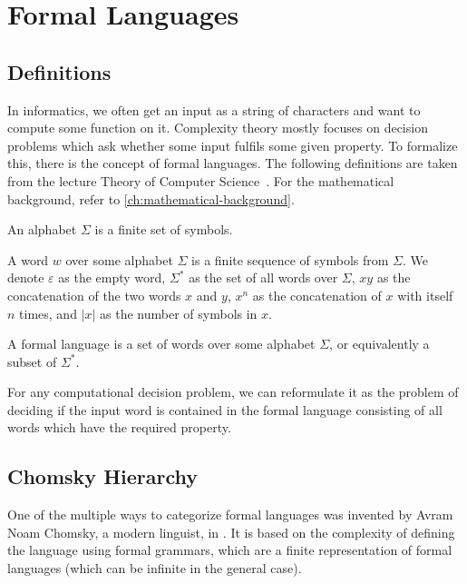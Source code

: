 \chapter{Formal Languages}\label{ch:formal-languages}


\section{Definitions}\label{sec:definition}

In informatics, we often get an input as a string of characters and want to compute some function on it.
Complexity theory mostly focuses on decision problems which ask whether some input fulfils some given property.
To formalize this, there is the concept of formal languages.
The following definitions are taken from the lecture Theory of Computer Science~\cite{theory-cs}.
For the mathematical background, refer to \cref{ch:mathematical-background}.

\begin{define}[Alphabet]
    An alphabet $\Sigma$ is a finite set of symbols.
\end{define}

\begin{define}[Word]
    A word $w$ over some alphabet $\Sigma$ is a finite sequence of symbols from $\Sigma$.
    We denote $\varepsilon$ as the empty word, $\Sigma^*$ as the set of all words over $\Sigma$, $xy$ as the concatenation of the two words $x$ and $y$, $x^{n}$ as the concatenation of $x$ with itself $n$ times, and $|x|$ as the number of symbols in $x$.
\end{define}

\begin{define}
    A formal language is a set of words over some alphabet $\Sigma$, or equivalently a subset of $\Sigma^*$.
\end{define}

For any computational decision problem, we can reformulate it as the problem of deciding if the input word is contained in the formal language consisting of all words which have the required property.


\section{Chomsky Hierarchy}\label{sec:chromsky-hierarchy}

One of the multiple ways to categorize formal languages was invented by Avram Noam Chomsky, a modern linguist, in \cite{Chomsky1959}.
It is based on the complexity of defining the language using formal grammars, which are a finite representation of formal languages (which can be infinite in the general case).


